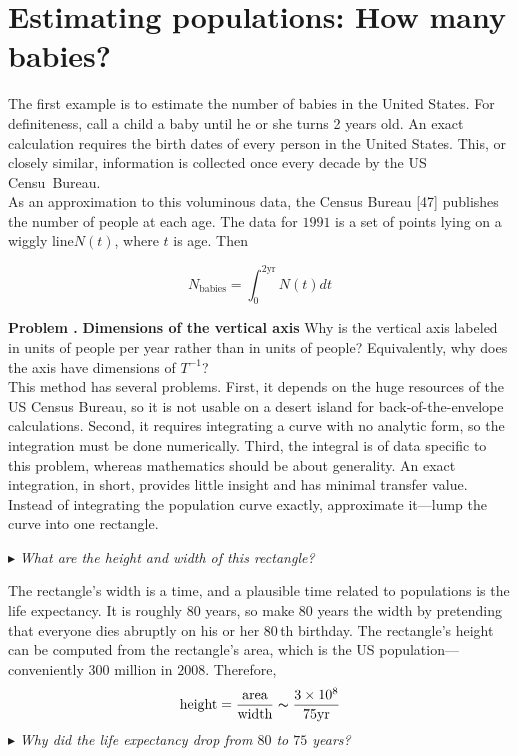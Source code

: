 \documentclass[fleqn]{book}
\newcounter{pro1}
\newcommand{\pro}{\par\addtocounter{pro1}{1}%
\textbf{Problem \arabic{chapter}.\arabic{pro1} }\quad}
\begin{document}
\section{ Estimating populations: How many babies?}

The first example is to estimate the number of babies in the United States.
For definiteness, call a child a baby until he or she turns 2 years old.
An exact calculation requires the birth dates of every person in the United States.
This, or closely similar, information is collected once every decade by the US Censu~Bureau.\\
\hangindent=-3cm
As an approximation to this voluminous data, the Census Bureau [47] publishes the number of people at each age.
The data for $1991$ is a set of points lying on a wiggly line$N(t)$, where $t$ is age.
Then
\begin{flushleft}
\begin{equation}
N_\text{babies}=\int^{2 \text{yr}}_0 N(t)dt
\end{equation}
\end{flushleft}
\pro
\textbf{Dimensions of the vertical axis}
Why is the vertical axis labeled in units of people per year rather than in units
of people?  Equivalently, why does the axis have dimensions of $T^{-1}$?\\

This method has several problems.
First, it depends on the huge resources of the US Census Bureau, so it is not usable on a desert island for back-of-the-envelope calculations.
Second, it requires integrating a curve with no analytic form, so the integration must be done numerically.
Third, the integral is of data specific to this problem, whereas mathematics should be about generality.
An exact integration, in short, provides little insight and has minimal transfer value.
Instead of integrating the population curve exactly, approximate it---lump the curve into one rectangle.\\
\begin{flushleft}
$\blacktriangleright$ \textit{What are the height and width of this rectangle?}
\end{flushleft}

The rectangle’s width is a time, and a plausible time related to populations is the life expectancy.
It is roughly $80$ years, so make $80$ years the width by pretending that everyone dies abruptly on his or her $80$\,th birthday.
The rectangle’s height can be computed from the rectangle’s area, which
is the US population---conveniently $300$ million in $2008$.
Therefore,
\begin{equation}
\text{height}=\frac{\text{area}}{\text{width}}\thicksim\frac{3 \times 10^8}{75 \text{yr}}
\end{equation}
$\blacktriangleright$ \textit{Why did the life expectancy drop from $80$ to $75$ years?}\newpage
\end{document}
